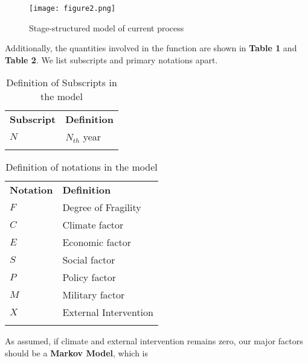 \documentclass{mcmthesis}
\newlength\savedwidth
\newcommand\whline{\noalign{\global\savedwidth\arrayrulewidth
                            \global\arrayrulewidth 1.2pt}%
                   \hline
                   \noalign{\global\arrayrulewidth\savedwidth}}
\newlength\savewidth
\newcommand\shline{\noalign{\global\savewidth\arrayrulewidth
                            \global\arrayrulewidth 1.2pt}%
                   \hline
                   \noalign{\global\arrayrulewidth\savewidth}}
\begin{document}
\begin{figure}[h]
	\small
	\centering
	\texttt{[image: figure2.png]}
	\caption{Stage-structured model of current process} \label{fig:Stage-structured model of current process}
\end{figure}

\noindent Additionally, the quantities involved in the function are shown in \textbf{Table 1} and \textbf{Table 2}. We list subscripts and primary notations apart.\\

\begin{table}[htbp]
	\renewcommand\arraystretch{1.5}
	\footnotesize
	\centering
	\begin{tabular}{m{3cm}<{\centering}|m{10cm}<{\centering}}
		\whline
		\textbf{Subscript}&\textbf{Definition}\\
		\whline 
		$N$&$N_{th}$ year\\ 
		\shline
	\end{tabular}
	\caption{Definition of Subscripts in the model}\label{tab:Definition of Subscripts in the model}
\end{table}
\begin{table}[htbp]
	\renewcommand\arraystretch{1.5}
	\footnotesize
	\centering
	\begin{tabular}{m{3cm}<{\centering}|m{10cm}<{\centering}}
		\whline
		\textbf{Notation}&\textbf{Definition}\\
		\whline 
		$F$&Degree of Fragility\\
		$C$&Climate factor\\
		$E$&Economic factor\\
		$S$&Social factor\\
		$P$&Policy factor\\ 
		$M$&Military factor\\
		$X$&External Intervention\\
		\shline
	\end{tabular}
	\caption{Definition of notations in the model}\label{tab:Definition of notations in the model}
\end{table}

As assumed, if climate and external intervention remains zero, our major factors should be a \textbf{Markov Model}, which is
\end{document}
